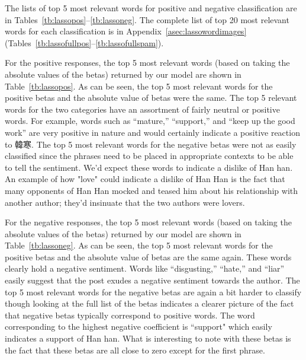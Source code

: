 \documentclass[11pt]{article}
\newcommand{\note}[1]{{\em \color{red} #1}}
\newcommand{\1}[1]{{\mathbf 1}\left\{#1\right\}}        %
\begin{document}
%



The lists of top 5 most relevant words for positive and negative classification are in Tables~\ref{tb:lassopos}--\ref{tb:lassoneg}.
The complete list of top 20 most relevant words for each classification is in Appendix~\ref{asec:lassowordimages} (Tables~\ref{tb:lassofullpos}--\ref{tb:lassofullspam}).


For the positive responses, the top 5 most relevant words (based on taking the absolute values of the betas) returned by our model are shown in Table~\ref{tb:lassopos}. As can be seen, the top 5 most relevant words for the positive betas and the absolute value of betas were the same. The top 5 relevant words for the two categories have an assortment of fairly neutral or positive words. For example, words such as ``mature,'' ``support,'' and ``keep up the good work'' are very positive in nature and would certainly indicate a positive reaction to 韓寒. The top 5 most relevant words for the negative betas were not as easily classified since the phrases need to be placed in appropriate contexts to be able to tell the sentiment.  We'd expect these words to indicate a dislike of Han han.  An example of how "love" could indicate a dislike of Han Han is the fact that many opponents of Han Han mocked and teased him about his relationship with another author; they'd insinuate that the two authors were lovers.

For the negative responses, the top 5 most relevant words (based on taking the absolute values of the betas) returned by our model are shown in Table~\ref{tb:lassoneg}. As can be seen, the top 5 most relevant words for the positive betas and the absolute value of betas are the same again.  These words clearly hold a negative sentiment.  Words like ``disgusting,'' ``hate,'' and ``liar'' easily suggest that the post exudes a negative sentiment towards the author. The top 5 most relevant words for the negative betas are again a bit harder to classify though looking at the full list of the betas indicates a clearer picture of the fact that negative betas typically correspond to positive words.  The word corresponding to the highest negative coefficient is ``support" which easily indicates a support of Han han. What is interesting to note with these betas is the fact that these betas are all close to zero except for the first phrase.
\end{document}
